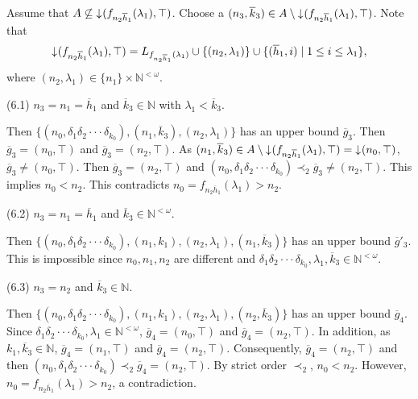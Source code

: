 \documentclass[preprint,12pt]{elsarticle}
\numberwithin{equation}{section}
\newcommand{\dn}{\mathord{\downarrow}\hspace{0.05em}}
\begin{document}
Assume that $A\not\subseteq\dn(f_{n_{2}\overline{h}_{1}}(\lambda_{1}),\top)$. Choose a $(n_{3},\overline{k}_{3})\in A\setminus\dn(f_{n_{2}\overline{h}_{1}}(\lambda_{1}),\top)$. Note that
$$\dn(f_{n_{2}\overline{h}_{1}}(\lambda_{1}),\top)=L_{f_{n_{2}\overline{h}_{1}}(\lambda_{1})}\cup\{(n_{2},\lambda_{1})\}\cup\{(\overline{h}_{1},i)\mid 1\leq i\leq \lambda_{1}\},$$ where $(n_{2},\lambda_{1})\in\{n_{1}\}\times\mathbb{N}^{<\omega}$.

(6.1) $n_{3}=n_{1}=\overline{h}_{1}$ and $\overline{k}_{3}\in\mathbb{N}$ with $\lambda_{1}<\overline{k}_{3}$.

Then $\{(n_{0},\delta_{1}\delta_{2}\cdot\cdot\cdot\delta_{k_{0}}),(n_{1},\overline{k}_{3}),(n_{2},\lambda_{1})\}$ has an upper bound $\overline{g}_{3}$. Then $\overline{g}_{3}=(n_{0},\top)$ and $\overline{g}_{3}=(n_{2},\top)$. As $(n_{1},\overline{k}_{3})\in A\setminus\dn(f_{n_{2}\overline{h}_{1}}(\lambda_{1}),\top)=\dn(n_{0},\top)$, $\overline{g}_{3}\neq(n_{0},\top)$. Then $\overline{g}_{3}=(n_{2},\top)$ and $(n_{0},\delta_{1}\delta_{2}\cdot\cdot\cdot\delta_{k_{0}})\prec_{2}\overline{g}_{3}\neq(n_{2},\top)$. This implies $n_{0}<n_{2}$. This contradicts $n_{0}=f_{n_{2}\overline{h}_{1}}(\lambda_{1})>n_{2}$.

(6.2) $n_{3}=n_{1}=\overline{h}_{1}$ and $\overline{k}_{3}\in\mathbb{N}^{<\omega}$.

Then $\{(n_{0},\delta_{1}\delta_{2}\cdot\cdot\cdot\delta_{k_{0}}),(n_{1},k_{1}),(n_{2},\lambda_{1}), (n_{1},\overline{k}_{3})\}$ has an upper bound $\overline{g}'_{3}$. This is impossible since $n_{0},n_{1},n_{2}$ are different and $\delta_{1}\delta_{2}\cdot\cdot\cdot\delta_{k_{0}},\lambda_{1},\overline{k}_{3}\in\mathbb{N}^{<\omega}$.

(6.3) $n_{3}=n_{2}$ and $\overline{k}_{3}\in\mathbb{N}$.

Then $\{(n_{0},\delta_{1}\delta_{2}\cdot\cdot\cdot\delta_{k_{0}}),(n_{1},k_{1}),(n_{2},\lambda_{1}), (n_{2},\overline{k}_{3})\}$ has an upper bound $\overline{g}_{4}$. Since $\delta_{1}\delta_{2}\cdot\cdot\cdot\delta_{k_{0}},\lambda_{1}\in\mathbb{N}^{<\omega}$, $\overline{g}_{4}=(n_{0},\top)$ and $\overline{g}_{4}=(n_{2},\top)$. In addition, as $k_{1},\overline{k}_{3}\in\mathbb{N}$, $\overline{g}_{4}=(n_{1},\top)$ and $\overline{g}_{4}=(n_{2},\top)$. Consequently, $\overline{g}_{4}=(n_{2},\top)$ and then $(n_{0},\delta_{1}\delta_{2}\cdot\cdot\cdot\delta_{k_{0}})\prec_{2}\overline{g}_{4}=(n_{2},\top)$. By strict order $\prec_{2}$, $n_{0}<n_{2}$. However, $n_{0}=f_{n_{2}\overline{h}_{1}}(\lambda_{1})>n_{2}$, a contradiction.
\end{document}
